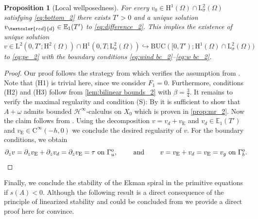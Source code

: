 \documentclass[preprint]{elsarticle}
\newtheorem{prop}[prop]{Proposition}
\numberwithin{equation}{section}
\newcommand {\E}	{\mathbb{E}}
\renewcommand{\H}{\mathrm{H}}
\newcommand{\sigmabar}{\bar{\sigma}}
\newcommand{\ocn}{\mathrm{o}}
\newcommand{\Gau}{\Gamma_u^{\ocn}}
\newcommand{\Gab}{\Gamma_b^{\ocn}}
\renewcommand{\bar}[1]{\overline{#1}}
\newcommand{\rC}{\mathrm{C}}
\newcommand{\rL}{\mathrm{L}}
\newcommand{\rH}{\H}
\newcommand{\rE}{\mathrm{E}}
\begin{document}
\begin{prop}[Local wellposedness]\label{prop:local_2}
	For every $v_0 \in \rH^{1}(\Omega) \cap \rL^2_{\sigmabar}(\Omega)$ satisfying \eqref{eq:bottom_2} there exists $T' > 0$ and a unique solution $v_{\textcolor{red}{d}} \in \E_1(T')$ to \eqref{eq:difference_2}. 
	This implies the existence of unique solution $v \in \rL^2(0,T';\rH^2(\Omega)) \cap \rH^1(0,T;\rL^2_{\sigmabar}(\Omega)) \hookrightarrow \mathrm{BUC}([0,T');\rH^{1}(\Omega)\cap \rL^2_{\sigmabar}(\Omega))$ to \eqref{eq:pe_2} with the boundary conditions \eqref{eq:wind bc_2}--\eqref{eq:w bc_2}.
\end{prop}
\begin{proof}
	Our proof follows the strategy from \cite{GGHHK:20_2} which verifies the assumption from \cite{PW:17_2}. Note that (H1) is trivial here, since we consider $F_1 = 0$. Furthermore, conditions (H2) and (H3) follow from \autoref{lem:bilinear bounds_2} with $\beta = \frac{3}{4}$.
	It remains to verify the maximal regularity and condition (S): 
	By \cite[Remark 1.1]{PW:17_2} it is sufficient to show that $A+\omega$ admits bounded $\mathcal{H}^\infty$-calculus on $X_0$ which is proven in \autoref{prop:mr_2}. 
	Now the claim follows from \cite[Theorem 1.2]{PW:17_2}. 
	Using the decomposition $v = v_d + v_{\rE}$ and	$v_d \in \E_1(T')$ and $v_{\rE} \in \rC^\infty(-h,0)$ we conclude the desired regularity of $v$.
	For the boundary conditions, we obtain  
	\begin{equation*}
		\partial_z v = \partial_z v_{\rE} + \partial_z v_d = \partial_z v_{\rE} = \tau \text{ on } \Gau, \qquad \text{ and } \qquad
		v = v_{\rE} + v_d = v_{\rE} = v_g \text{ on } \Gab . \qedhere
	\end{equation*} 
\end{proof}

Finally, we conclude the stability of the Ekman spiral in the primitive equations if $s(A) < 0$. Although the following result is a direct consequence of the principle of linearized stability and could be concluded from \cite[Theorem 5.3.1 \& Remark 5.3.2]{PS:16_2} we provide a direct proof here for convince. 
\end{document}
